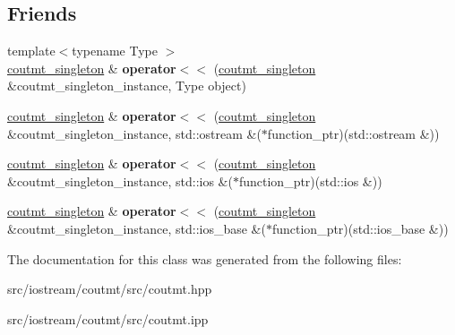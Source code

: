 \subsection*{Friends}
\begin{DoxyCompactItemize}
\item 
\hypertarget{classxstd_1_1coutmt__singleton_aae5812b8fa2d66eaaa921e864e1077d4}{{\footnotesize template$<$typename Type $>$ }\\\hyperlink{classxstd_1_1coutmt__singleton}{coutmt\-\_\-singleton} \& {\bfseries operator$<$$<$} (\hyperlink{classxstd_1_1coutmt__singleton}{coutmt\-\_\-singleton} \&coutmt\-\_\-singleton\-\_\-instance, Type object)}\label{classxstd_1_1coutmt__singleton_aae5812b8fa2d66eaaa921e864e1077d4}

\item 
\hypertarget{classxstd_1_1coutmt__singleton_a75138493a4c47f61c28762df29d5af97}{\hyperlink{classxstd_1_1coutmt__singleton}{coutmt\-\_\-singleton} \& {\bfseries operator$<$$<$} (\hyperlink{classxstd_1_1coutmt__singleton}{coutmt\-\_\-singleton} \&coutmt\-\_\-singleton\-\_\-instance, std\-::ostream \&($\ast$function\-\_\-ptr)(std\-::ostream \&))}\label{classxstd_1_1coutmt__singleton_a75138493a4c47f61c28762df29d5af97}

\item 
\hypertarget{classxstd_1_1coutmt__singleton_af343264ff6f5ba75b8f6eab378c55638}{\hyperlink{classxstd_1_1coutmt__singleton}{coutmt\-\_\-singleton} \& {\bfseries operator$<$$<$} (\hyperlink{classxstd_1_1coutmt__singleton}{coutmt\-\_\-singleton} \&coutmt\-\_\-singleton\-\_\-instance, std\-::ios \&($\ast$function\-\_\-ptr)(std\-::ios \&))}\label{classxstd_1_1coutmt__singleton_af343264ff6f5ba75b8f6eab378c55638}

\item 
\hypertarget{classxstd_1_1coutmt__singleton_af794d8d7f2993af42e84429e5f5b4c9a}{\hyperlink{classxstd_1_1coutmt__singleton}{coutmt\-\_\-singleton} \& {\bfseries operator$<$$<$} (\hyperlink{classxstd_1_1coutmt__singleton}{coutmt\-\_\-singleton} \&coutmt\-\_\-singleton\-\_\-instance, std\-::ios\-\_\-base \&($\ast$function\-\_\-ptr)(std\-::ios\-\_\-base \&))}\label{classxstd_1_1coutmt__singleton_af794d8d7f2993af42e84429e5f5b4c9a}

\end{DoxyCompactItemize}


The documentation for this class was generated from the following files\-:\begin{DoxyCompactItemize}
\item 
src/iostream/coutmt/src/coutmt.\-hpp\item 
src/iostream/coutmt/src/coutmt.\-ipp\end{DoxyCompactItemize}
